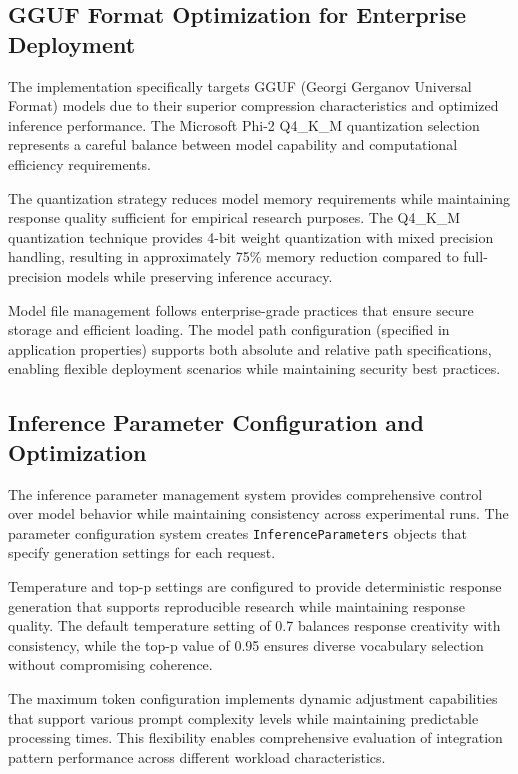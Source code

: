 \subsection{GGUF Format Optimization for Enterprise Deployment}

The implementation specifically targets GGUF (Georgi Gerganov Universal Format) models due to their superior compression characteristics and optimized inference performance. The Microsoft Phi-2 Q4\_K\_M quantization selection represents a careful balance between model capability and computational efficiency requirements.

The quantization strategy reduces model memory requirements while maintaining response quality sufficient for empirical research purposes. The Q4\_K\_M quantization technique provides 4-bit weight quantization with mixed precision handling, resulting in approximately 75\% memory reduction compared to full-precision models while preserving inference accuracy.

Model file management follows enterprise-grade practices that ensure secure storage and efficient loading. The model path configuration (specified in application properties) supports both absolute and relative path specifications, enabling flexible deployment scenarios while maintaining security best practices.

\subsection{Inference Parameter Configuration and Optimization}

The inference parameter management system provides comprehensive control over model behavior while maintaining consistency across experimental runs. The parameter configuration system creates \texttt{InferenceParameters} objects that specify generation settings for each request.


Temperature and top-p settings are configured to provide deterministic response generation that supports reproducible research while maintaining response quality. The default temperature setting of 0.7 balances response creativity with consistency, while the top-p value of 0.95 ensures diverse vocabulary selection without compromising coherence.

The maximum token configuration implements dynamic adjustment capabilities that support various prompt complexity levels while maintaining predictable processing times. This flexibility enables comprehensive evaluation of integration pattern performance across different workload characteristics.

